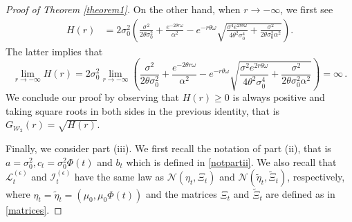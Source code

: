 \documentclass[12pt,thmsa]{article}
\begin{document}
\begin{proof}[Proof of Theorem \ref{theorem1}]
	On the other hand, when  $r\to-\infty$, we first see
	\[
	\begin{split}
		H(r) &= 2\sigma^2_0\left(\frac{\sigma^2}{2\theta\sigma_0^2}+ \frac{e^{-2\theta r\omega}}{\alpha^2}-e^{-r\theta \omega}\sqrt{\frac{\sigma^4 e^{2r\theta \omega}}{4\theta^2\sigma_0^4 }+\frac{\sigma^2}{2\theta\sigma_0^2\alpha^2}}\right).
	\end{split}
	\]
	The latter implies that 
	$$\lim_{r\to-\infty}H(r)=2\sigma^2_0\lim_{r\to-\infty}\left(\frac{\sigma^2}{2\theta\sigma_0^2}+ \frac{e^{-2\theta r\omega}}{\alpha^2}-e^{-r\theta \omega}\sqrt{\frac{\sigma^2e^{2r\theta \omega}}{4\theta^2\sigma_0^4 }+\frac{\sigma^2}{2\theta\sigma_0^2 \alpha^2}}\right)=\infty\,.$$
	We conclude our proof by observing that $H(r)\ge 0$ is always positive  and taking square roots in both sides in the previous identity, that is $G_{\mathcal{W}_2}(r)=\sqrt{H(r)}$.
	
	
	Finally, we consider part (iii).  We first
	recall the   notation of part (ii), that is $a=\sigma_0^2, c_t=\sigma_0^2\Phi(t)$ and $b_t$ which is defined in \eqref{notpartii}. We  also recall that $\mathcal{L}^{(\epsilon)}_{t}$ and $\mathcal{I}^{(\epsilon)}_{t}$ have the same law as  $\mathcal{N}(\eta_t, \Xi_t)$ and $\mathcal{N}(\widetilde{\eta}_t, \widetilde{\Xi}_t)$,  respectively,   where $\eta_t=\widetilde{\eta}_t=(\mu_0, \mu_0\Phi(t))$ and the matrices $\Xi_t$ and $\widetilde{\Xi}_t$ are defined as in \eqref{matrices}.
	

\end{proof}
\end{document}
